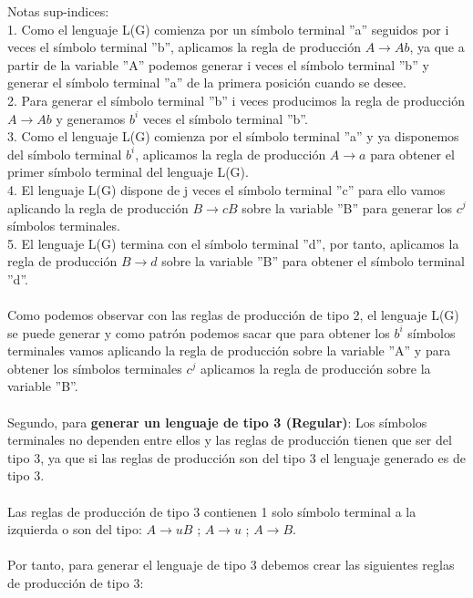 Notas sup-indices:
\\
1. Como el lenguaje L(G) comienza por un símbolo terminal ''a'' seguidos por i veces el símbolo terminal ''b'', aplicamos la regla de producción $A \rightarrow Ab$, ya que a partir de la variable ''A'' podemos generar i veces el símbolo terminal ''b'' y generar el símbolo terminal ''a'' de la primera posición cuando se desee.
\\
2. Para generar el símbolo terminal ''b'' i veces producimos la regla de producción $A \rightarrow Ab$ y generamos $b^{i}$ veces el símbolo terminal ''b''.
\\
3. Como el lenguaje L(G) comienza por el símbolo terminal ''a'' y ya disponemos del símbolo terminal $b^{i}$, aplicamos la regla de producción $A \rightarrow a$ para obtener el primer símbolo terminal del lenguaje L(G).
\\
4. El lenguaje L(G) dispone de j veces el símbolo terminal ''c'' para ello vamos aplicando la regla de producción $B \rightarrow cB$ sobre la variable ''B'' para generar los $c^{j}$ símbolos terminales.
\\
5. El lenguaje L(G) termina con el símbolo terminal ''d'', por tanto, aplicamos la regla de producción $B \rightarrow d$ sobre la variable ''B'' para obtener el símbolo terminal ''d''.
\\ \\
Como podemos observar con las reglas de producción de tipo 2, el lenguaje L(G) se puede generar y como patrón podemos sacar que para obtener los $b^{i}$ símbolos terminales vamos aplicando la regla de producción sobre la variable ''A'' y para obtener los símbolos terminales $c^{j}$ aplicamos la regla de producción sobre la variable ''B''.
\\ \\
Segundo, para \textbf{generar un lenguaje de tipo 3 (Regular)}: Los símbolos terminales no dependen entre ellos y las reglas de producción tienen que ser del tipo 3, ya que si las reglas de producción son del tipo 3 el lenguaje generado es de tipo 3.
\\ \\
Las reglas de producción de tipo 3 contienen 1 solo símbolo terminal a la izquierda o son del tipo: $A \rightarrow uB$ ; $A \rightarrow u$ ; $A \rightarrow B$.
\\ \\
Por tanto, para generar el lenguaje de tipo 3 debemos crear las siguientes reglas de producción de tipo 3:
